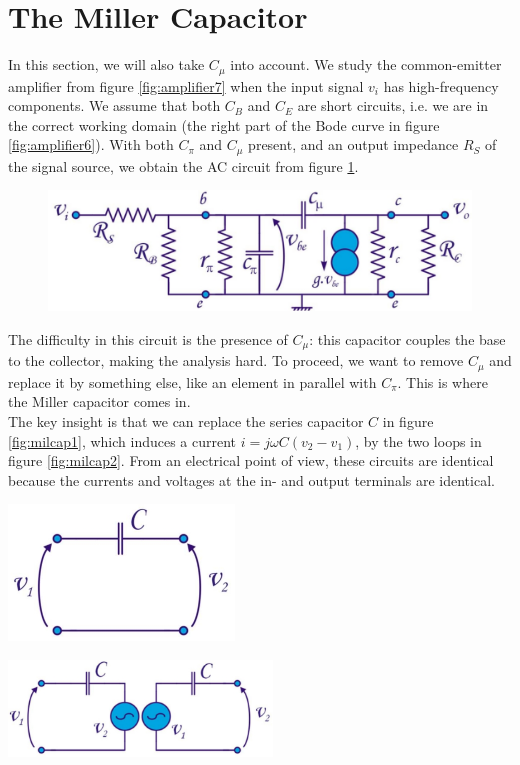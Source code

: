 \section{The Miller Capacitor}
\label{sec:miller_cap}
In this section, we will also take $C_\mu$ into account. We study the common-emitter amplifier from figure \ref{fig:amplifier7} when the input signal $v_i$ has high-frequency components. We assume that both $C_B$ and $C_E$ are short circuits, i.e. we are in the correct working domain (the right part of the Bode curve in figure \ref{fig:amplifier6}). With both $C_{\pi}$ and $C_{\mu}$ present, and an output impedance $R_S$ of the signal source, we obtain the AC circuit from figure \ref{fig:hf_model2}.

\begin{figure}[h!]
	\centering
	\includegraphics[width=12cm]{figures/ch03/hf_model2.jpg}
	\caption{}
	\label{fig:hf_model2}
\end{figure}
The difficulty in this circuit is the presence of $C_{\mu}$: this capacitor couples the base to the collector, making the analysis hard. To proceed, we want to remove $C_{\mu}$ and replace it by something else, like an element in parallel with $C_{\pi}$. This is where the Miller capacitor comes in.\\
The key insight is that we can replace the series capacitor $C$ in figure \ref{fig:milcap1}, which induces a current $i = j \omega C (v_2 - v_1)$, by the two loops in figure \ref{fig:milcap2}. From an electrical point of view, these circuits are identical because the currents and voltages at the in- and output terminals are identical.

\begin{minipage}{.5\textwidth}
	\centering
	\includegraphics[width=6cm]{figures/ch03/milcap1.jpg}
	\label{fig:milcap1}
\end{minipage}%
\begin{minipage}{.5\textwidth}
	\centering
	\includegraphics[width=7cm]{figures/ch03/milcap2.jpg}
	\label{fig:milcap2}
\end{minipage}

